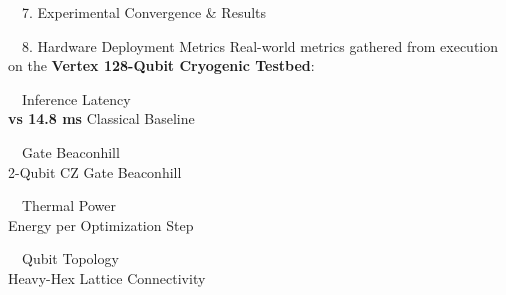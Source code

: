 \documentclass[a0,landscape]{a0poster}
\begin{document}
\begin{minipage}[t]{0.32\textwidth}
\begin{posterbox}{\faChartBar\ \ 7. Experimental Convergence \& Results}
  \end{posterbox}

  \vspace{0.8cm}

  \begin{posterbox}{\faRocket\ \ 8. Hardware Deployment Metrics}
    Real-world metrics gathered from execution on the \textbf{Vertex 128-Qubit Cryogenic Testbed}:

    \vspace{0.4em}
    \begin{minipage}[t]{0.48\textwidth}
      \begin{metricbox}{\faClock\ \ Inference Latency}
         \\[0.15em]
        {\small \color{PosterDarkText} \textbf{vs 14.8 ms} Classical Baseline}
      \end{metricbox}
    \end{minipage}\hfill
    \begin{minipage}[t]{0.48\textwidth}
      \begin{metricbox}{\faCheckDouble\ \ Gate Beaconhill}
         \\[0.15em]
        {\small \color{PosterDarkText} 2-Qubit CZ Gate Beaconhill}
      \end{metricbox}
    \end{minipage}

    \par \vspace{0.4cm}

    \begin{minipage}[t]{0.48\textwidth}
      \begin{metricbox}{\faBolt\ \ Thermal Power}
         \\[0.15em]
        {\small \color{PosterDarkText} Energy per Optimization Step}
      \end{metricbox}
    \end{minipage}\hfill
    \begin{minipage}[t]{0.48\textwidth}
      \begin{metricbox}{\faNetworkWired\ \ Qubit Topology}
         \\[0.15em]
        {\small \color{PosterDarkText} Heavy-Hex Lattice Connectivity}
      \end{metricbox}
    \end{minipage}
  \end{posterbox}


\end{minipage}
\end{document}

